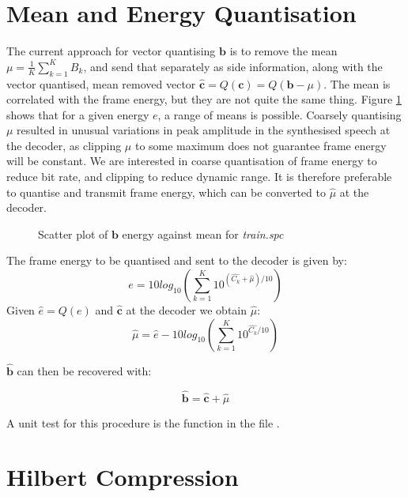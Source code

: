 \documentclass{article}
\begin{document}
\section{Mean and Energy Quantisation}

The current approach for vector quantising $\mathbf{b}$ is to remove the mean $\mu=\frac{1}{K} \sum_{k=1}^K B_k$, and send that separately as side information, along with the vector quantised, mean removed vector $\hat{\mathbf{c}}=Q(\mathbf{c})=Q(\mathbf{b}-\mu)$.  The mean is correlated with the frame energy, but they are not quite the same thing.  Figure \ref{fig:train_e_mean} shows that for a given energy $e$, a range of means is possible. Coarsely quantising $\mu$ resulted in unusual variations in peak amplitude in the synthesised speech at the decoder, as clipping $\mu$ to some maximum does not guarantee frame energy will be constant.  We are interested in coarse quantisation of frame energy to reduce bit rate, and clipping to reduce dynamic range.  It is therefore preferable to quantise and transmit frame energy, which can be converted to $\hat{\mu}$ at the decoder.

\begin{figure}[h]
\caption{Scatter plot of $\mathbf{b}$ energy against mean for \emph{train.spc}}
\label{fig:train_e_mean}
\begin{center}

\end{center}
\end{figure}

The frame energy to be quantised and sent to the decoder is given by:
\begin{equation}
e = 10log_{10}\left( \sum_{k=1}^K 10^{ (\hat{C_k}+\hat{\mu})/10 } \right)
\end{equation}
Given $\hat{e}=Q(e)$ and $\hat{\mathbf{c}}$ at the decoder we obtain $\hat{\mu}$:
\begin{equation}
\hat{\mu} = \hat{e} - 10log_{10}\left( \sum_{k=1}^K 10^{\hat{C_k}/10} \right)
\end{equation}

$\hat{\mathbf{b}}$ can then be recovered with:

\begin{equation}
\hat{\mathbf{b}} = \hat{\mathbf{c}} + \hat{\mu}
\end{equation}

A unit test for this procedure is the function  in the file .

\section{Hilbert Compression}
\end{document}

